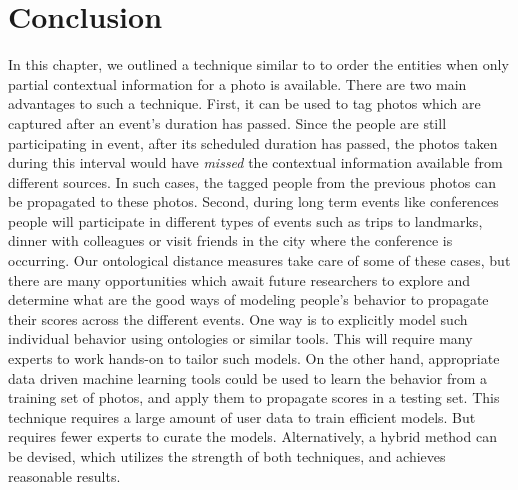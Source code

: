 \section{Conclusion}
In this chapter, we outlined a technique similar to \cite{page1999pagerank} to order the entities when only partial contextual information for a photo is available. There are two main advantages to such a technique. First, it can be used to tag photos which are captured after an event's duration has passed. Since the people are still participating in event, after its scheduled duration has passed, the photos taken during this interval would have \textit{missed} the contextual information available from different sources. In such cases, the tagged people from the previous photos can be propagated to these photos. Second, during long term events like conferences people will participate in different types of events such as trips to landmarks, dinner with colleagues or visit friends in the city where the conference is occurring. Our ontological distance measures take care of some of these cases, but there are many opportunities which await future researchers to explore and determine what are the good ways of modeling people's behavior to propagate their scores across the different events. One way is to explicitly model such individual behavior using ontologies or similar tools. This will require many experts to work hands-on to tailor such models. On the other hand, appropriate data driven machine learning tools could be used to learn the behavior from a training set of photos, and apply them to propagate scores in a testing set. This technique requires a large amount of user data to train efficient models. But requires fewer experts to curate the models. Alternatively, a hybrid method can be devised, which utilizes the strength of both techniques, and achieves reasonable results.